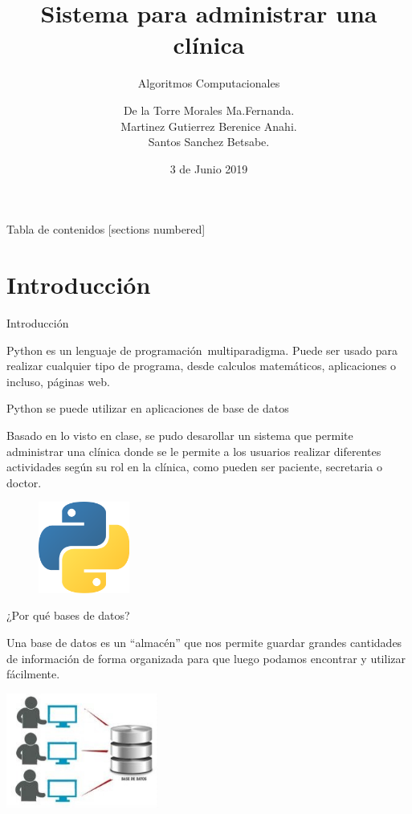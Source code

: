 \documentclass[10pt]{beamer}
\title{Sistema para administrar una clínica}
\subtitle{Algoritmos Computacionales}
\date{3 de Junio 2019}
\author{De la Torre Morales Ma.Fernanda. \\
Martinez Gutierrez Berenice Anahi. \\
Santos Sanchez Betsabe. \\
}
\begin{document}
\maketitle

\begin{frame}{Tabla de contenidos}
  [sections numbered]
  \tableofcontents[hideallsubsections]
\end{frame}

\section{Introducción}
\begin{frame}[fragile]{Introducción}

  Python es un lenguaje de programación multiparadigma. Puede ser usado para realizar cualquier tipo de programa, desde calculos matemáticos, aplicaciones o incluso, páginas web.
  
  Python se puede utilizar en aplicaciones de base de datos


  Basado en lo visto en clase, se pudo desarollar un sistema que permite administrar una clínica donde se le permite a los usuarios realizar diferentes actividades según su rol en la clínica, como pueden ser paciente, secretaria o doctor.
  
  \begin{figure}[t]
    \raggedleft
    \includegraphics[width=3cm]{logopy.png}
  \end{figure}

\end{frame}

\begin{frame}[fragile]{¿Por qué bases de datos?}

  Una base de datos es un “almacén” que nos permite guardar grandes cantidades de información
  de forma organizada para que luego podamos encontrar y utilizar fácilmente.
  
  
  
  \centering
  \includegraphics[width=5cm]{Python2.jpg}
  
  
\end{frame}
\end{document}
